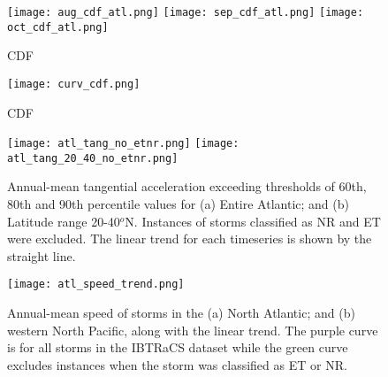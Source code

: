 \documentclass[wcd,manuscript]{copernicus}
\begin{document}
\begin{figure*}[t]
  \texttt{[image: aug\_cdf\_atl.png]}
  \texttt{[image: sep\_cdf\_atl.png]}
  \texttt{[image: oct\_cdf\_atl.png]}
  \caption{CDF}\label{fig:tang_month_cdf}
\end{figure*}







\begin{figure*}[t]
  \texttt{[image: curv\_cdf.png]}
  \caption{CDF}\label{fig:curv_cdf}
\end{figure*}



\clearpage


\begin{figure*}[t]
  \texttt{[image: atl\_tang\_no\_etnr.png]}
   \texttt{[image: atl\_tang\_20\_40\_no\_etnr.png]}

  \caption{Annual-mean tangential acceleration exceeding thresholds of 60th, 80th and 90th percentile values for (a) Entire Atlantic; and (b) Latitude range 20-40$^o$N. Instances of storms classified as NR and ET were excluded. The linear trend for each timeseries is shown by the straight line.}\label{fig:atl_speed}
\end{figure*}






\begin{figure*}[t]
  \texttt{[image: atl\_speed\_trend.png]}
\caption{Annual-mean speed of storms in the (a) North Atlantic; and (b) western North Pacific, along with the linear trend. The purple curve is for all storms in the IBTRaCS dataset while the green curve excludes instances when
the storm was classified as ET or NR.}\label{fig:trend_speed}
\end{figure*}
\end{document}
